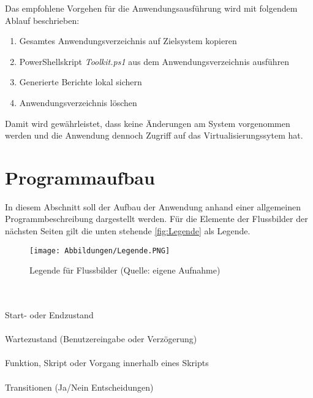 Das empfohlene Vorgehen für die Anwendungsausführung wird mit folgendem Ablauf beschrieben:
\begin{enumerate}[noitemsep,topsep=0pt,parsep=0pt,partopsep=0pt]
        \item Gesamtes Anwendungsverzeichnis auf Zielsystem kopieren
        \item PowerShellskript \textit{Toolkit.ps1} aus dem Anwendungsverzeichnis ausführen
        \item Generierte Berichte lokal sichern
        \item Anwendungsverzeichnis löschen
\end{enumerate}
Damit wird gewährleistet, dass keine Änderungen am System vorgenommen werden und die Anwendung dennoch Zugriff auf das Virtualisierungssytem hat.
\newpage
\section{Programmaufbau}
In diesem Abschnitt soll der Aufbau der Anwendung anhand einer allgemeinen Programmbeschreibung dargestellt werden. Für die Elemente der Flussbilder der nächsten Seiten gilt die unten stehende \autoref{fig:Legende} als Legende.\hspace*{\fill}
\begin{wrapfigure}[14]{l}{8cm}
    \centering
    \texttt{[image: Abbildungen/Legende.PNG]}\caption[Legende für Flussbilder ]{Legende für Flussbilder (Quelle: eigene Aufnahme)}
    \label{fig:Legende}
\end{wrapfigure}
\\\\
Start- oder Endzustand\\\\%
Wartezustand (Benutzereingabe oder Verzögerung)\\\\%
Funktion, Skript oder Vorgang innerhalb eines Skripts\\\\%
Transitionen (Ja/Nein Entscheidungen)\\\\\\%
